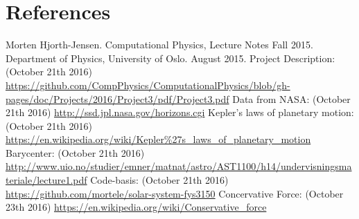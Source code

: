 \documentclass[norsk,a4paper,12pt]{article}
\begin{document}
{\section{References}
\begingroup
\renewcommand{\section}[2]{}
\begin{thebibliography}{}
  Morten Hjorth-Jensen.
  Computational Physics, Lecture Notes Fall 2015.
  Department of Physics, University of Oslo.
  August 2015.
  Project Description: 					(October 21th 2016)\newline
  \url{https://github.com/CompPhysics/ComputationalPhysics/blob/gh-pages/doc/Projects/2016/Project3/pdf/Project3.pdf}
  Data from NASA: 						(October 21th 2016)\newline
  \url{http://ssd.jpl.nasa.gov/horizons.cgi}
  Kepler's laws of planetary motion: 	(October 21th 2016)\newline
  \url{https://en.wikipedia.org/wiki/Kepler\%27s_laws_of_planetary_motion}
  Barycenter: 							(October 21th 2016)\newline
  \url{http://www.uio.no/studier/emner/matnat/astro/AST1100/h14/undervisningsmateriale/lecture1.pdf}
  Code-basis: 							(October 21th 2016)\newline
  \url{https://github.com/mortele/solar-system-fys3150}
  Concervative Force:                   (October 23th 2016)\newline
  \url{https://en.wikipedia.org/wiki/Conservative_force}
\end{thebibliography}
\endgroup
\end{document}
